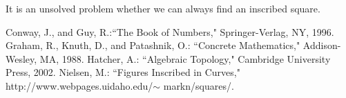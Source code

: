 \documentclass[12pt,twoside]{article}
\theoremstyle{norm}
\begin{document}
It is an unsolved problem whether we can always find an inscribed square.
\begin{thebibliography}{9}
 Conway, J., and Guy, R.:``The Book of Numbers," Springer-Verlag, NY, 1996.
 Graham, R., Knuth, D., and Patashnik, O.: ``Concrete Mathematics," Addison-Wesley, MA, 1988.
 Hatcher, A.: ``Algebraic Topology," Cambridge University Press, 2002.
 Nielsen, M.: ``Figures Inscribed in Curves," http://www.webpages.uidaho.edu/$\sim$ markn/squares/.
\end{thebibliography}
\end{document}
